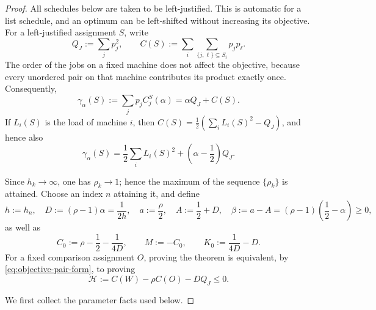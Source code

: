 \documentclass[11pt]{article}
\theoremstyle{remark}
\begin{document}
\begin{proof}
All schedules below are taken to be left-justified.  This is automatic for
a list schedule, and an optimum can be left-shifted without increasing its
objective.  For a left-justified assignment $S$, write
\[
 Q_J:=\sum_jp_j^2,
 \qquad
 C(S):=\sum_i\sum_{\{j,\ell\}\subseteq S_i}p_jp_\ell.
\]
The order of the jobs on a fixed machine does not affect the objective,
because every unordered pair on that machine contributes its product
exactly once.  Consequently,
\begin{equation}\label{eq:objective-pair-form}
 \gamma_{\alpha}(S):=\sum_jp_jC_j^S(\alpha)=\alpha Q_J+C(S).
\end{equation}
If $L_i(S)$ is the load of machine $i$, then
$C(S)=\tfrac12(\sum_iL_i(S)^2-Q_J)$, and hence also
\begin{equation}\label{eq:objective-load-form}
 \gamma_{\alpha}(S)
 =\frac12\sum_iL_i(S)^2+
   \left(\alpha-\frac12\right)Q_J.
\end{equation}

Since $h_k\to\infty$, one has $\rho_k\to1$; hence the maximum of
the sequence $\{\rho_k\}$ is attained.  Choose an index $n$ attaining
it, and define
\begin{equation}\label{eq:main-parameters}
 h:=h_n,
 \quad D:=(\rho-1)\alpha=\frac1{2h},
 \quad a:=\frac\rho2,
 \quad A:=\frac12+D,
 \quad \beta:=a-A=(\rho-1)\left(\frac12-\alpha\right)\geq0,
\end{equation}
as well as
\begin{equation}\label{eq:C0-M-K0}
 C_0:=\rho-\frac12-\frac1{4D},
 \qquad M:=-C_0,
 \qquad K_0:=\frac1{4D}-D.
\end{equation}
For a fixed comparison assignment $O$, proving the theorem is
equivalent, by \eqref{eq:objective-pair-form}, to proving
\begin{equation}\label{eq:support-functional}
 \mathcal H:=C(W)-\rho C(O)-DQ_J\leq0.
\end{equation}

We first collect the parameter facts used below.


\end{proof}
\end{document}

